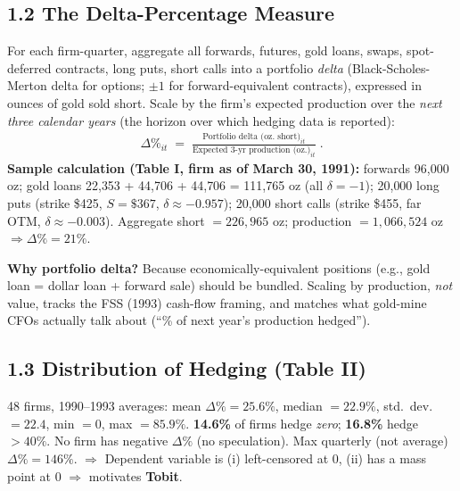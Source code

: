 \documentclass[11pt]{article}
\newcommand{\dP}{\Delta\%}
\begin{document}
\subsection*{1.2 The Delta-Percentage Measure}
For each firm-quarter, aggregate all forwards, futures, gold loans, swaps, spot-deferred contracts, long puts, short calls into a portfolio \emph{delta} (Black-Scholes-Merton delta for options; $\pm 1$ for forward-equivalent contracts), expressed in ounces of gold sold short. Scale by the firm's expected production over the \emph{next three calendar years} (the horizon over which hedging data is reported):
\begin{align*}
\dP_{it} \;=\; \frac{\text{Portfolio delta (oz.\ short)}_{it}}{\text{Expected 3-yr production (oz.)}_{it}}\; .
\end{align*}
\textbf{Sample calculation (Table I, firm as of March 30, 1991):} forwards 96{,}000 oz; gold loans 22{,}353 + 44{,}706 + 44{,}706 = 111{,}765 oz (all $\delta=-1$); 20{,}000 long puts (strike \$425, $S=\$367$, $\delta \approx -0.957$); 20{,}000 short calls (strike \$455, far OTM, $\delta \approx -0.003$). Aggregate short $= 226{,}965$ oz; production $= 1{,}066{,}524$ oz $\Rightarrow \dP = 21\%$.
\begin{alertbox}
\textbf{Why portfolio delta?} Because economically-equivalent positions (e.g., gold loan = dollar loan + forward sale) should be bundled. Scaling by production, \emph{not} value, tracks the FSS (1993) cash-flow framing, and matches what gold-mine CFOs actually talk about (``\% of next year's production hedged'').
\end{alertbox}

\subsection*{1.3 Distribution of Hedging (Table II)}
48 firms, 1990--1993 averages: mean $\dP = 25.6\%$, median $= 22.9\%$, std.\ dev.\ $= 22.4$, min $= 0$, max $= 85.9\%$. \textbf{14.6\%} of firms hedge \emph{zero}; \textbf{16.8\%} hedge $>40\%$. No firm has negative $\dP$ (no speculation). Max quarterly (not average) $\dP = 146\%$. $\Rightarrow$ Dependent variable is (i) left-censored at 0, (ii) has a mass point at 0 $\Rightarrow$ motivates \textbf{Tobit}.
\end{document}
